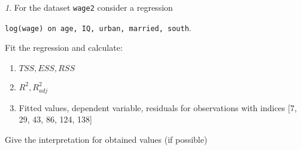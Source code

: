 \documentclass[12pt]{article}
\theoremstyle{remark}
\newtheorem{problem}{}[section]
\begin{document}
\begin{problem}
For the dataset \texttt{wage2} consider a regression
\begin{center}
\texttt{log(wage) on age, IQ, urban, married, south}.
\end{center}
Fit the regression and calculate:
\begin{enumerate}
	\item \(TSS, ESS, RSS\)
	\item \(R^2, R^2_{adj}\)
	\item Fitted values, dependent variable, residuals 
	for observations with indices [7, 29, 43, 86, 124, 138]
\end{enumerate}
Give the interpretation for obtained values (if possible)
\end{problem}
\end{document}
